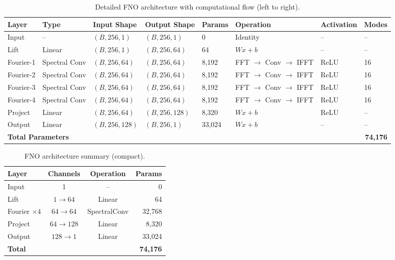 \begin{table}[htbp]
\centering
\caption{Detailed FNO architecture with computational flow (left to right).}
\label{tab:fno_detailed}
\small
\begin{tabular}{p{1.5cm}p{1.5cm}p{1.8cm}p{1.8cm}p{1.8cm}p{1.8cm}p{1.5cm}p{1.5cm}}
\toprule
\textbf{Layer} & \textbf{Type} & \textbf{Input Shape} & \textbf{Output Shape} & \textbf{Params} & \textbf{Operation} & \textbf{Activation} & \textbf{Modes} \\
\midrule
Input & -- & $(B, 256, 1)$ & $(B, 256, 1)$ & 0 & Identity & -- & -- \\
\midrule
Lift & Linear & $(B, 256, 1)$ & $(B, 256, 64)$ & 64 & $Wx + b$ & -- & -- \\
\midrule
Fourier-1 & Spectral Conv & $(B, 256, 64)$ & $(B, 256, 64)$ & 8,192 & FFT $\rightarrow$ Conv $\rightarrow$ IFFT & ReLU & 16 \\
\midrule
Fourier-2 & Spectral Conv & $(B, 256, 64)$ & $(B, 256, 64)$ & 8,192 & FFT $\rightarrow$ Conv $\rightarrow$ IFFT & ReLU & 16 \\
\midrule
Fourier-3 & Spectral Conv & $(B, 256, 64)$ & $(B, 256, 64)$ & 8,192 & FFT $\rightarrow$ Conv $\rightarrow$ IFFT & ReLU & 16 \\
\midrule
Fourier-4 & Spectral Conv & $(B, 256, 64)$ & $(B, 256, 64)$ & 8,192 & FFT $\rightarrow$ Conv $\rightarrow$ IFFT & ReLU & 16 \\
\midrule
Project & Linear & $(B, 256, 64)$ & $(B, 256, 128)$ & 8,320 & $Wx + b$ & ReLU & -- \\
\midrule
Output & Linear & $(B, 256, 128)$ & $(B, 256, 1)$ & 33,024 & $Wx + b$ & -- & -- \\
\midrule
\multicolumn{4}{l}{\textbf{Total Parameters}} & \multicolumn{4}{r}{\textbf{74,176}} \\
\bottomrule
\end{tabular}
\end{table}


\begin{table}[htbp]
\centering
\caption{FNO architecture summary (compact).}
\label{tab:fno_compact}
\begin{tabular}{lccr}
\toprule
\textbf{Layer} & \textbf{Channels} & \textbf{Operation} & \textbf{Params} \\
\midrule
Input & 1 & -- & 0 \\
Lift & $1 \rightarrow 64$ & Linear & 64 \\
Fourier $\times 4$ & $64 \rightarrow 64$ & SpectralConv & 32,768 \\
Project & $64 \rightarrow 128$ & Linear & 8,320 \\
Output & $128 \rightarrow 1$ & Linear & 33,024 \\
\midrule
\textbf{Total} & & & \textbf{74,176} \\
\bottomrule
\end{tabular}
\end{table}

